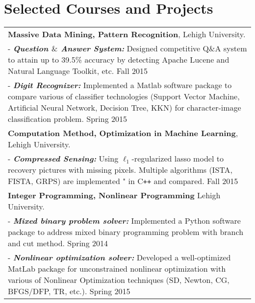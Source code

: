 \documentclass[a4paper,11pt]{article} %
\begin{document}
\section{Selected Courses and Projects}
\begin{tabular}{p{17.5cm}}
    \textbf{Massive Data Mining, Pattern Recognition}, Lehigh University.\\
    \footnotesize{- \textbf{\emph{Question $\&$ Answer System:}} Designed competitive Q$\mbox{\&}$A system to attain up to 39.5\% accuracy by detecting Apache Lucene and Natural Language Toolkit, etc. \hfill{Fall 2015}}\\
\footnotesize{- \textbf{\emph{Digit Recognizer:}} Implemented a Matlab software package to compare various of classifier technologies (Support Vector Machine, Artificial Neural Network, Decision Tree, KKN) for character-image classification problem.} \hfill{Spring 2015}\\ 
\textbf{Computation Method, Optimization in Machine Learning}, Lehigh University. \\ 
\footnotesize{- \textbf{\emph{Compressed Sensing:}} Using $\ell_1$-regularized lasso model to recovery pictures with missing pixels. Multiple algorithms (ISTA, FISTA, GRPS) are implemented " in C\texttt{++} and compared.} \hfill{Fall 2015}\\ 
\textbf{Integer Programming, Nonlinear Programming} Lehigh University.\\ 
\footnotesize{- \textbf{\emph{Mixed binary problem solver:}} Implemented a Python software package to address mixed binary programming problem with branch and cut method.} \hfill{Spring 2014}\\ 
\footnotesize{- \textbf{\emph{Nonlinear optimization solver:}} Developed a well-optimized MatLab package for unconstrained nonlinear optimization with various of Nonlinear Optimization techniques (SD, Newton, CG, BFGS/DFP, TR, etc.).} \hfill{Spring 2015}\\ 
\end{tabular}
\end{document}
